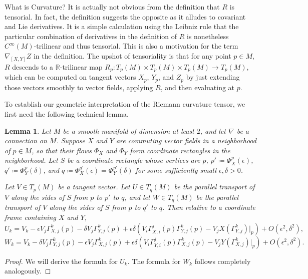 \documentclass{article}
\numberwithin{equation}{subsection}
\newtheorem{lemma}{Lemma}[subsection]
\theoremstyle{definition}
\begin{document}
\begin{section}{What is Curvature?}
It is actually not obvious from the definition that $R$ is tensorial. In fact, the definition suggests the opposite as it alludes to covariant and Lie derivatives. It is a simple calculation using the Leibniz rule that the particular combination of derivatives in the definition of $R$ is nonetheless $C^{\infty}(M)$-trilinear and thus tensorial. This is also a motivation for the term $\nabla_{[X,Y]}Z$ in the definition. The upshot of tensoriality is that for any point $p\in M$, $R$ descends to a $\mathbb{R}$-trilinear map $R_p\colon T_p(M)\times T_p(M)\times T_p(M)\to T_p(M)$, which can be computed on tangent vectors $X_p$, $Y_p$, and $Z_p$ by just extending those vectors smoothly to vector fields, applying $R$, and then evaluating at $p$.

To establish our geometric interpretation of the Riemann curvature tensor, we first need the following technical lemma.

\begin{lemma}\label{paralleltransports}
Let $M$ be a smooth manifold of dimension at least $2$, and let $\nabla$ be a connection on $M$. Suppose $X$ and $Y$ are commuting vector fields in a neighborhood of $p\in M$, so that their flows $\Phi_X$ and $\Phi_Y$ form coordinate rectangles in the neighborhood. Let $S$ be a coordinate rectangle whose vertices are $p$, $p'\coloneqq\Phi_{X}^{p}(\epsilon)$, $q'\coloneqq\Phi_{Y}^{p}(\delta)$, and $q\coloneqq\Phi_X^{q'}(\epsilon)=\Phi_Y^{p'}(\delta)$ for some sufficiently small $\epsilon,\delta>0$.

Let $V\in T_p(M)$ be a tangent vector. Let $U\in T_q(M)$ be the parallel transport of $V$ along the sides of $S$ from $p$ to $p'$ to $q$, and let $W\in T_q(M)$ be the parallel transport of $V$ along the sides of $S$ from $p$ to $q'$ to $q$. Then relative to a coordinate frame containing $X$ and $Y$,
\begin{equation}
U_k=V_k-\epsilon V_j\Gamma_{X,j}^{k}(p)-\delta V_j\Gamma_{Y,j}^{k}(p)+\epsilon\delta\left(V_i\Gamma_{X,i}^{j}(p)\Gamma_{Y,j}^{k}(p)-V_jX(\Gamma_{Y,j}^k)|_p\right)+O(\epsilon^2,\delta^2),
\end{equation}
\begin{equation}
W_k=V_k-\delta V_j\Gamma_{Y,j}^{k}(p)-\epsilon V_j\Gamma_{X,j}^{k}(p)+\epsilon\delta\left(V_i\Gamma_{Y,i}^{j}(p)\Gamma_{X,j}^{k}(p)-V_jY(\Gamma_{X,j}^{k})|_p\right)+O(\epsilon^2,\delta^2).
\end{equation}
\end{lemma}

\begin{proof}
We will derive the formula for $U_k$. The formula for $W_k$ follows completely analogously.


\end{proof}
\end{section}
\end{document}
